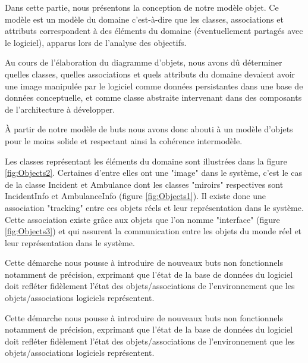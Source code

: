 Dans cette partie, nous présentons la conception de notre modèle objet. Ce
modèle est un modèle du domaine c'est-à-dire que les classes, associations
et attributs correspondent à des éléments du domaine (éventuellement
partagés avec le logiciel), apparus lors de l'analyse des objectifs. 

Au cours de l'élaboration du diagramme d'objets, nous avons dû déterminer
quelles classes, quelles associations et quels attributs du domaine devaient avoir une
image manipulée par le logiciel comme données persistantes dans une base de
données conceptuelle, et comme classe abstraite intervenant dans des
composants de l'architecture à développer. 

À partir de notre modèle de buts nous avons donc abouti à un modèle d'objets
pour le moins solide et respectant ainsi la cohérence intermodèle. 

Les classes représentant les éléments du domaine sont illustrées dans la
figure \ref{fig:Objects2}. Certaines d'entre elles ont une "image" dans le système, c'est
le cas de la classe Incident et Ambulance dont les classes "miroirs"
respectives sont IncidentInfo et AmbulanceInfo (figure  \ref{fig:Objects1}). Il existe donc
une association "tracking" entre ces objets réels et leur représentation
dans le système. Cette association existe grâce aux objets que l'on nomme
"interface" (figure  \ref{fig:Objects3}) et qui assurent la communication entre les objets du
monde réel et leur représentation dans le système. 

Cette démarche nous pousse à introduire de nouveaux buts non fonctionnels
notamment de précision, exprimant que l'état de la base de données du
logiciel doit refléter fidèlement l'état des objets/associations de
l'environnement que les objets/associations logiciels représentent. 


Cette démarche nous pousse à introduire de nouveaux buts non fonctionnels
notamment de précision, exprimant que l'état de la base de données du
logiciel doit refléter fidèlement l'état des objets/associations de
l'environnement que les objets/associations logiciels représentent. 

